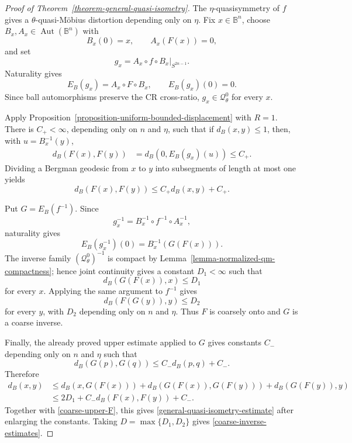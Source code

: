 \documentclass[11pt]{article}
\theoremstyle{definition}
\theoremstyle{remark}
\theoremstyle{definition}
\newcommand{\B}{\mathbb B}
\newcommand{\Aut}{\operatorname{Aut}}
\begin{document}
\begin{proof}[Proof of Theorem~\ref{theorem-general-quasi-isometry}]

The \(\eta\)-quasisymmetry of \(f\) gives a
\(\theta\)-quasi-M\"obius distortion depending only on \(\eta\).  Fix
\(x\in\B^n\), choose \(B_x,A_x\in\Aut(\B^n)\) with
\[
        B_x(0)=x,
        \qquad A_x(F(x))=0,
\]
and set
\[
        g_x=A_x\circ f\circ B_x|_{S^{2n-1}}.
\]
Naturality gives
\[
        E_B(g_x)=A_x\circ F\circ B_x,
        \qquad E_B(g_x)(0)=0.
\]
Since ball automorphisms preserve the CR cross-ratio,
\(g_x\in\mathcal Q_\theta^0\) for every \(x\).

Apply Proposition~\ref{proposition-uniform-bounded-displacement} with \(R=1\).
There is \(C_+<\infty\), depending only on \(n\) and \(\eta\), such that if
\(d_B(x,y)\le1\), then, with \(u=B_x^{-1}(y)\),
\[
\begin{aligned}
        d_B(F(x),F(y))
        &=d_B(0,E_B(g_x)(u))
        \le C_+.
\end{aligned}
\]
Dividing a Bergman geodesic from \(x\) to \(y\) into subsegments of length at
most one yields
\begin{equation}\label{coarse-upper-F}
        d_B(F(x),F(y))\le C_+d_B(x,y)+C_+.
\end{equation}

Put \(G=E_B(f^{-1})\).  Since
\[
        g_x^{-1}=B_x^{-1}\circ f^{-1}\circ A_x^{-1},
\]
naturality gives
\[
        E_B(g_x^{-1})(0)=B_x^{-1}(G(F(x))).
\]
The inverse family \((\mathcal Q_\theta^0)^{-1}\) is compact by
Lemma~\ref{lemma-normalized-qm-compactness}; hence joint continuity gives a
constant \(D_1<\infty\) such that
\begin{equation}\label{GF-close-id}
        d_B(G(F(x)),x)\le D_1
\end{equation}
for every \(x\).  Applying the same argument to \(f^{-1}\) gives
\begin{equation}\label{FG-close-id}
        d_B(F(G(y)),y)\le D_2
\end{equation}
for every \(y\), with \(D_2\) depending only on \(n\) and \(\eta\).  Thus \(F\)
is coarsely onto and \(G\) is a coarse inverse.

Finally, the already proved upper estimate applied to \(G\) gives constants
\(C_-\) depending only on \(n\) and \(\eta\) such that
\[
        d_B(G(p),G(q))\le C_-d_B(p,q)+C_-.
\]
Therefore
\[
\begin{aligned}
        d_B(x,y)
        &\le d_B(x,G(F(x)))
        +d_B(G(F(x)),G(F(y)))
        +d_B(G(F(y)),y)\\
        &\le 2D_1+C_-d_B(F(x),F(y))+C_-.
\end{aligned}
\]
Together with \eqref{coarse-upper-F}, this gives
\eqref{general-quasi-isometry-estimate} after enlarging the constants.  Taking
\(D=\max\{D_1,D_2\}\) gives \eqref{coarse-inverse-estimates}.
\end{proof}
\end{document}
